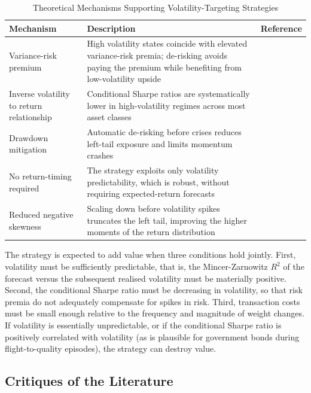 \documentclass[12pt, a4paper]{article}
\begin{document}
\begin{table}[H]
  \centering
  \caption{Theoretical Mechanisms Supporting Volatility-Targeting Strategies}
  \label{tab:theory}
  \small
  \begin{tabularx}{\textwidth}{lXl}
    \toprule
    \textbf{Mechanism} & \textbf{Description} & \textbf{Reference} \\
    \midrule
    Variance-risk premium
      & High volatility states coincide with elevated variance-risk premia; de-risking
        avoids paying the premium while benefiting from low-volatility upside
      & \citet{Moreira2017} \\[4pt]
    Inverse volatility to return relationship
      & Conditional Sharpe ratios are systematically lower in high-volatility regimes
        across most asset classes
      & \citet{Harvey2018} \\[4pt]
    Drawdown mitigation
      & Automatic de-risking before crises reduces left-tail exposure and limits
        momentum crashes
      & \citet{Bongaerts2020} \\[4pt]
    No return-timing required
      & The strategy exploits only volatility predictability, which is robust, without
        requiring expected-return forecasts
      & \citet{Harvey2018} \\[4pt]
    Reduced negative skewness
      & Scaling down before volatility spikes truncates the left tail, improving the
        higher moments of the return distribution
      & \citet{Moreira2017} \\
    \bottomrule
  \end{tabularx}
\end{table}

The strategy is expected to add value when three conditions hold jointly. First,
volatility must be sufficiently predictable, that is, the Mincer-Zarnowitz $R^2$ of the
forecast versus the subsequent realised volatility must be materially positive. Second,
the conditional Sharpe ratio must be decreasing in volatility, so that risk premia do not
adequately compensate for spikes in risk. Third, transaction costs must be small enough
relative to the frequency and magnitude of weight changes. If volatility is essentially
unpredictable, or if the conditional Sharpe ratio is positively correlated with
volatility (as is plausible for government bonds during flight-to-quality episodes), the
strategy can destroy value.

\subsection{Critiques of the Literature}
\end{document}
